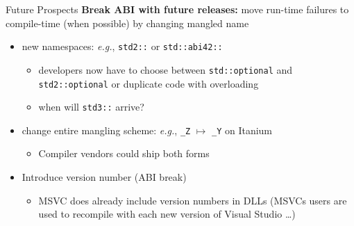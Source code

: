 \begin{frame}
    \centering
    \scalebox{3}{Future Prospects}
\end{frame}

\begin{frame}{Future Prospects}
    \textbf{Break ABI with future releases:} move run-time failures to compile-time (when possible) by changing mangled name

    \begin{itemize}
        \item new namespaces: \textit{e.g.}, \texttt{std2::} or \texttt{std::abi42::}
        \begin{itemize}
            \item developers now have to choose between \texttt{std::optional} and \texttt{std2::optional} or duplicate code with overloading
            \item when will \texttt{std3::} arrive?
        \end{itemize}
        \item change entire mangling scheme: \textit{e.g.}, \texttt{\_Z} $\mapsto$ \texttt{\_Y} on Itanium
        \begin{itemize}
            \item Compiler vendors could ship both forms
        \end{itemize}
        \item Introduce version number (ABI break)
        \begin{itemize}
            \item MSVC does already include version numbers in DLLs (MSVCs users are used to recompile with each new version of Visual Studio \ldots)
        \end{itemize}
    \end{itemize}
\end{frame}

